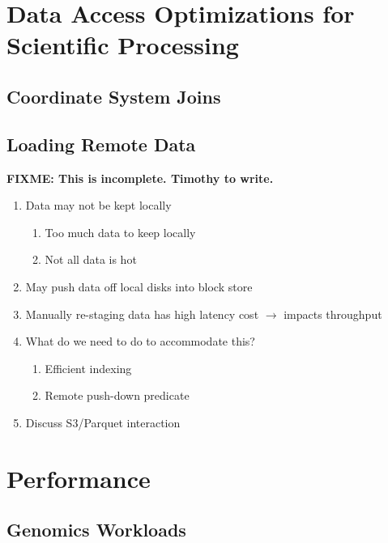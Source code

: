 \documentclass{acm_proc_article-sp}
\begin{document}
\section{Data Access Optimizations for \\ Scientific Processing}
\label{sec:optimizations-scientific-processing}

\subsection{Coordinate System Joins}
\label{sec:coordinate-system-joins}


\subsection{Loading Remote Data}
\label{sec:loading-remote-data}

\textbf{FIXME: This is incomplete. Timothy to write.}

\begin{enumerate}
\item Data may not be kept locally
\begin{enumerate}
\item Too much data to keep locally
\item Not all data is hot
\end{enumerate}
\item May push data off local disks into block store
\item Manually re-staging data has high latency cost $\rightarrow$ impacts throughput
\item What do we need to do to accommodate this?
\begin{enumerate}
\item Efficient indexing
\item Remote push-down predicate
\end{enumerate}
\item Discuss S3/Parquet interaction
\end{enumerate}

\section{Performance}
\label{sec:performance}


\subsection{Genomics Workloads}
\label{sec:genomics-performance}
\end{document}
